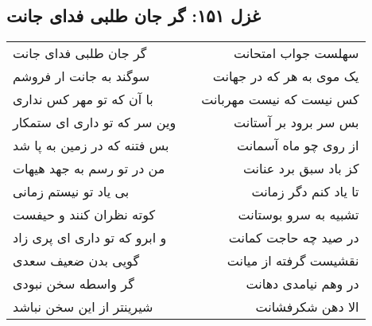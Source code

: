 \begin{center}
\section*{غزل ۱۵۱: گر جان طلبی فدای جانت}
\label{sec:151}
\begin{longtable}{l p{0.5cm} r}
گر جان طلبی فدای جانت
&&
سهلست جواب امتحانت
\\
سوگند به جانت ار فروشم
&&
یک موی به هر که در جهانت
\\
با آن که تو مهر کس نداری
&&
کس نیست که نیست مهربانت
\\
وین سر که تو داری ای ستمکار
&&
بس سر برود بر آستانت
\\
بس فتنه که در زمین به پا شد
&&
از روی چو ماه آسمانت
\\
من در تو رسم به جهد هیهات
&&
کز باد سبق برد عنانت
\\
بی یاد تو نیستم زمانی
&&
تا یاد کنم دگر زمانت
\\
کوته نظران کنند و حیفست
&&
تشبیه به سرو بوستانت
\\
و ابرو که تو داری ای پری زاد
&&
در صید چه حاجت کمانت
\\
گویی بدن ضعیف سعدی
&&
نقشیست گرفته از میانت
\\
گر واسطه سخن نبودی
&&
در وهم نیامدی دهانت
\\
شیرینتر از این سخن نباشد
&&
الا دهن شکرفشانت
\\
\end{longtable}
\end{center}
